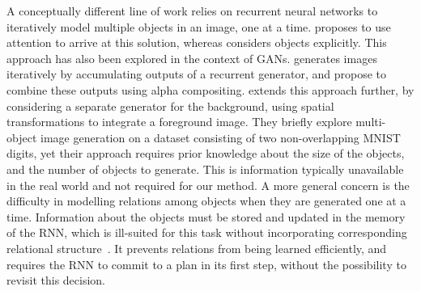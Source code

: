 \documentclass{article}
\begin{document}
A conceptually different line of work relies on recurrent neural networks to iteratively model multiple objects in an image, one at a time.
\cite{gregor2015draw} proposes to use attention to arrive at this solution, whereas \cite{eslami2016attend} considers objects explicitly.
This approach has also been explored in the context of GANs. 
\cite{im2016generating} generates images iteratively by accumulating outputs of a recurrent generator, and \cite{kwak2016generating} propose to combine these outputs using alpha compositing.
\cite{yang2017lr} extends this approach further, by considering a separate generator for the background, using spatial transformations to integrate a foreground image.
They briefly explore multi-object image generation on a dataset consisting of two non-overlapping MNIST digits, yet their approach requires prior knowledge about the size of the objects, and the number of objects to generate.
This is information typically unavailable in the real world and not required for our method.
A more general concern is the difficulty in modelling relations among objects when they are generated one at a time.
Information about the objects must be stored and updated in the memory of the RNN, which is ill-suited for this task without incorporating corresponding relational structure~\citep{santoro2018relational}.
It prevents relations from being learned efficiently, and requires the RNN to commit to a plan in its first step, without the possibility to revisit this decision.
\end{document}
